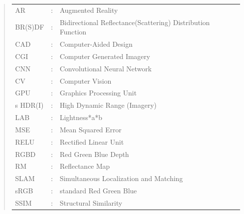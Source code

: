 \documentclass[ %
                    author={Gavin Parker},
                supervisor={Dr. Neill Campbell},
                    degree={MEng},
                     title={Deep Learning for Illumination Estimation from Stereo Images},
                  subtitle={},
                      type={Research},
                      year={2018} ]{dissertation}
\begin{document}
\begin{quote}
\noindent
\begin{tabular}{lcl}
AR                 &:     & Augmented Reality                                           \\
BR(S)DF        &:    & Bidirectional Reflectance(Scattering) Distribution Function \\
CAD         &:  & Computer-Aided Design \\
CGI         &:  & Computer Generated Imagery \\
CNN                 &:     & Convolutional Neural Network                               \\
CV          &:  & Computer Vision \\
GPU         &:   & Graphics Processing Unit \\s
HDR(I)          &:    & High Dynamic Range (Imagery)                    \\
LAB         &:  & Lightness*a*b \\
MSE         &:  & Mean Squared Error \\
RELU         &:   & Rectified Linear Unit \\
RGBD         &:  & Red Green Blue Depth \\
RM           &:   & Reflectance Map \\
SLAM        &:  & Simultaneous Localization and Matching \\
sRGB        &:    & standard Red Green Blue                  \\
SSIM        &:    & Structural Similarity                    \\
\end{tabular}
\end{quote}


\noindent


%
\end{document}
